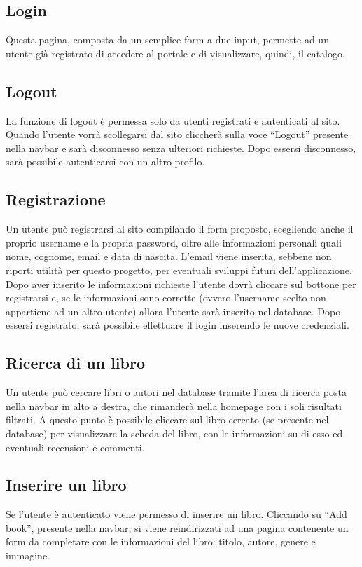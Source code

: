 \documentclass[italian]{article}
\begin{document}
\subsection{Login}
Questa pagina, composta da un semplice form a due input, permette ad un utente già registrato di accedere al portale e di visualizzare, quindi, il catalogo.

\subsection{Logout}
La funzione di logout è permessa solo da utenti registrati e autenticati al sito.
Quando l’utente vorrà scollegarsi dal sito cliccherà sulla voce “Logout” presente nella navbar e sarà disconnesso senza ulteriori richieste. Dopo essersi disconnesso, sarà possibile autenticarsi con un altro profilo.

\subsection{Registrazione}
Un utente può registrarsi al sito compilando il form proposto, scegliendo anche il proprio username e la propria password, oltre alle informazioni personali quali nome, cognome, email e data di nascita. L'email viene inserita, sebbene non riporti utilità per questo progetto, per eventuali sviluppi futuri dell'applicazione. Dopo aver inserito le informazioni richieste l'utente dovrà cliccare sul bottone per registrarsi e, se le informazioni sono corrette (ovvero l’username scelto non appartiene ad un altro utente) allora l'utente sarà inserito nel database.
Dopo essersi registrato, sarà possibile effettuare il login inserendo le nuove credenziali.

\subsection{Ricerca di un libro}
Un utente può cercare libri o autori nel database tramite l’area di ricerca posta nella navbar in alto a destra, che rimanderà nella homepage con i soli risultati filtrati.
A questo punto è possibile cliccare sul libro cercato (se presente nel database) per visualizzare la scheda del libro, con le informazioni su di esso ed eventuali recensioni e commenti.

\subsection{Inserire un libro}
Se l'utente è autenticato viene permesso di inserire un libro. Cliccando su “Add book”, presente nella navbar, si viene reindirizzati ad una pagina contenente un form da completare con le informazioni del libro: titolo, autore, genere e immagine.
\end{document}
